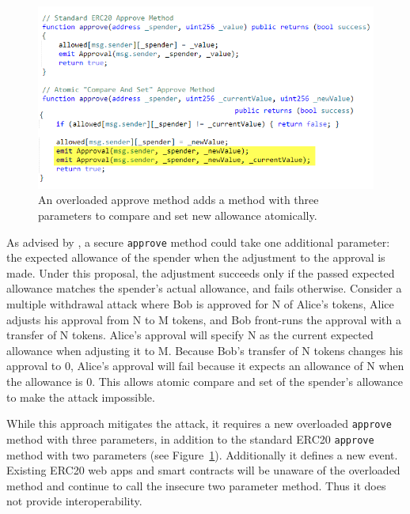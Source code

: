 \begin{figure}[t]
	\centering
	\includegraphics[width=1.0\linewidth]{figures/multiple_withdrawal_12.png}
	\caption{An overloaded approve method adds a method with three parameters to compare and set new allowance atomically.\label{fig:api}}
\end{figure}

As advised by \cite{Ref03}, a secure \texttt{approve} method could take one additional parameter: the expected allowance of the spender when the adjustment to the approval is made. Under this proposal, the adjustment succeeds only if the passed expected allowance matches the spender's actual allowance, and fails otherwise. Consider a multiple withdrawal attack where Bob is approved for N of Alice's tokens, Alice adjusts his approval from N to M tokens, and Bob front-runs the approval with a transfer of N tokens. Alice's approval will specify N as the current expected allowance when adjusting it to M. Because Bob's transfer of N tokens changes his approval to 0, Alice's approval will fail because it expects an allowance of N when the allowance is 0. This allows atomic compare and set of the spender's allowance to make the attack impossible. 

While this approach mitigates the attack, it requires a new overloaded \texttt{approve} method with three parameters, in addition to the standard ERC20 \texttt{approve} method with two parameters (see Figure~\ref{fig:api}). Additionally it defines a new event. Existing ERC20 web apps and smart contracts will be unaware of the overloaded method and continue to call the insecure two parameter method. Thus it does not provide interoperability. 


